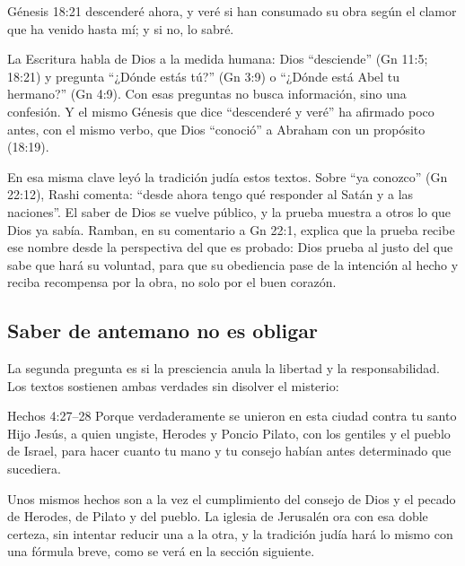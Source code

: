 \begin{verso}{Génesis 18:21}
descenderé ahora, y veré si han consumado su obra según el clamor que ha venido hasta mí; y si no, lo sabré.
\end{verso}

La Escritura habla de Dios a la medida humana: Dios ``desciende'' (Gn 11:5; 18:21) y pregunta ``¿Dónde estás tú?'' (Gn 3:9) o ``¿Dónde está Abel tu hermano?'' (Gn 4:9). Con esas preguntas no busca información, sino una confesión. Y el mismo Génesis que dice ``descenderé y veré'' ha afirmado poco antes, con el mismo verbo, que Dios ``conoció'' a Abraham con un propósito (18:19).

En esa misma clave leyó la tradición judía estos textos. Sobre ``ya conozco'' (Gn 22:12), Rashi comenta: ``desde ahora tengo qué responder al Satán y a las naciones''. El saber de Dios se vuelve público, y la prueba muestra a otros lo que Dios ya sabía. Ramban, en su comentario a Gn 22:1, explica que la prueba recibe ese nombre desde la perspectiva del que es probado: Dios prueba al justo del que sabe que hará su voluntad, para que su obediencia pase de la intención al hecho y reciba recompensa por la obra, no solo por el buen corazón.


\subsection{Saber de antemano no es obligar}
La segunda pregunta es si la presciencia anula la libertad y la responsabilidad. Los textos sostienen ambas verdades sin disolver el misterio:

\begin{verso}{Hechos 4:27–28}
Porque verdaderamente se unieron en esta ciudad contra tu santo Hijo Jesús, a quien ungiste, Herodes y Poncio Pilato, con los gentiles y el pueblo de Israel, para hacer cuanto tu mano y tu consejo habían antes determinado que sucediera.
\end{verso}

Unos mismos hechos son a la vez el cumplimiento del consejo de Dios y el pecado de Herodes, de Pilato y del pueblo. La iglesia de Jerusalén ora con esa doble certeza, sin intentar reducir una a la otra, y la tradición judía hará lo mismo con una fórmula breve, como se verá en la sección siguiente.

